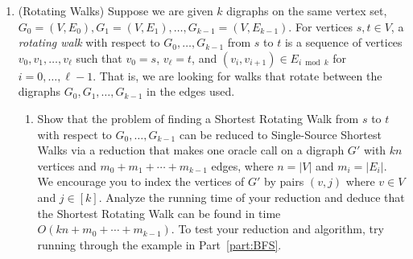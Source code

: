 \documentclass[11pt]{article}
\begin{document}
\begin{enumerate}
\begin{proof}
We use the implementation of the dictionary described in Lecture 9. Define a random hash function $h$ which takes inputs from the size of the universe of objects with a duplicate and returns a number in the range of $(0, m)$ for some $m$ we define. It takes $O(1)$ time to generate and store $h$, and each time we calculate $h(x)$ for some $x$ it takes time $O(1)$. To search our dictionary, it takes time $O(1 + n/m)$, which becomes the same as $O(1)$ as long as $m = \Omega (n)$, which we can easily define here (in fact, we did this without problem in class). So we have a Las Vegas algorithm that uses a dictionary data structure, as we are asked.

Here is our algorithm: first we generate and store $h$ in $O(1)$ time. Then for each $x$ in the input set of size $n$, we first search to see if $x$ has been hashed in time $O(1)$; if so, we return that element (because we know it to be a duplicate). If not, we hash it in time $O(1)$. We do this at most $n$ times, which means that we do a maximum of $2n - 1$ operations; therefore, the runtime for our algorithm overall is $O(n)$, as desired.
\end{proof}

\item  (Rotating Walks)       
    Suppose we are given $k$ digraphs on the same vertex set, $G_0=(V,E_0), G_1=(V,E_1), \ldots, G_{k-1}=(V,E_{k-1})$.  For vertices $s,t\in V$, a {\em rotating walk} with respect to $G_0,\ldots,G_{k-1}$ from $s$ to $t$ is a sequence of vertices $v_0,v_1,\ldots,v_{\ell}$ such that $v_0=s$, $v_\ell=t$, and $(v_i,v_{i+1})\in E_{i \bmod k}$ for $i=0,\ldots,\ell-1$.  That is, we are looking for walks that rotate between the digraphs $G_0,G_1,\ldots,G_{k-1}$ in the edges used.
    \begin{enumerate}
    
        \item Show that the problem of finding a Shortest Rotating Walk from $s$ to $t$ with respect to $G_0,\ldots,G_{k-1}$ 
        can be reduced to Single-Source Shortest Walks via a reduction that makes one oracle call on 
        a digraph $G'$ with $kn$ vertices and $m_0+m_1+\cdots+m_{k-1}$ edges, where $n=|V|$ and $m_i=|E_i|$.
        We encourage you to index the vertices of $G'$ by pairs $(v,j)$ where $v\in V$ and $j\in [k]$. 
        Analyze the running time of your reduction and deduce that the Shortest Rotating Walk can be found in time $O(kn+m_0+\cdots+m_{k-1})$.
       To test your reduction and algorithm, try running through the example in Part~\ref{part:BFS}.  \label{part:ReduceToOrdinary} 
       

\end{enumerate}
\end{enumerate}
\end{document}
